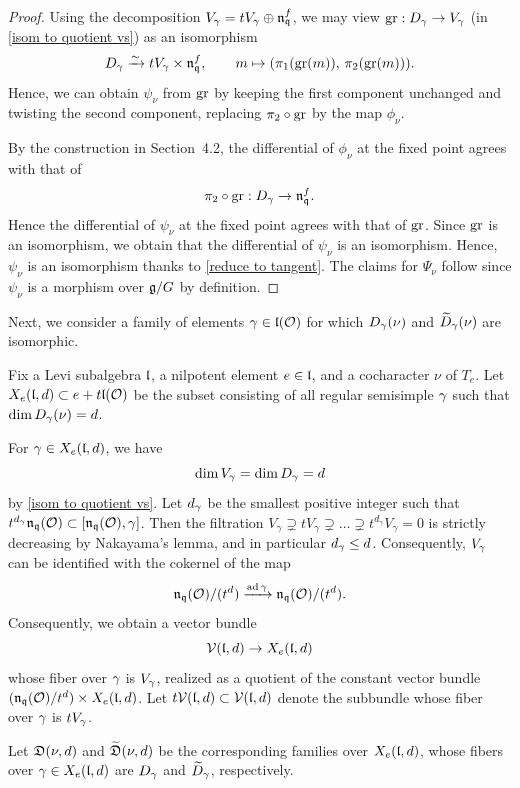 \documentclass[11pt]{article}
\numberwithin{equation}{section}
\begin{document}
\begin{proof}
Using the decomposition $V_\gamma = tV_\gamma \oplus \mathfrak{n}_{\mathfrak{q}}^f$, we may view $\operatorname{gr}: D_\gamma\to V_\gamma$ (in \cref{isom to quotient vs}) as an isomorphism
\[
D_\gamma \xrightarrow{\sim} tV_\gamma \times \mathfrak{n}_{\mathfrak{q}}^f,
\qquad
m \mapsto (\pi_1(\operatorname{gr}(m)),\, \pi_2(\operatorname{gr}(m))).
\]
Hence, we can obtain $\psi_\nu$ from $\operatorname{gr}$ by keeping the first component unchanged
and twisting the second component, replacing $\pi_2\circ \operatorname{gr}$ by the map $\phi_\nu$.

By the construction in Section~4.2, the differential of $\phi_\nu$ at the fixed
point agrees with that of
\[
\pi_2\circ \operatorname{gr} : D_\gamma \to \mathfrak{n}_{\mathfrak{q}}^f.
\]
Hence the differential of $\psi_\nu$ at the fixed point agrees with that of $\operatorname{gr}$.
Since $\operatorname{gr}$ is an isomorphism, we obtain that the differential of $\psi_\nu$ is an isomorphism. Hence, $\psi_\nu$ is an isomorphism thanks to \cref{reduce to tangent}. The claims for $\Psi_\nu$ follow since $\psi_\nu$ is a morphism over $\mathfrak{g}/G$ by definition.
\end{proof}
Next, we consider a family of elements $\gamma\in \mathfrak{l}(\mathcal{O})$ for which
$D_\gamma(\nu)$ and $\widetilde D_\gamma(\nu)$ are isomorphic.

\begin{defin}
Fix a Levi subalgebra $\mathfrak{l}$, a nilpotent element $e\in \mathfrak{l}$, and a cocharacter $\nu$ of $T_e$.
Let $X_e(\mathfrak{l},d)\subset e+t\mathfrak{l}(\mathcal{O})$ be the subset consisting of all regular semisimple
$\gamma$ such that $\dim D_\gamma(\nu) = d$.
\end{defin}

For $\gamma\in X_e(\mathfrak{l},d)$, we have
\[
\dim V_\gamma = \dim D_\gamma = d
\]
by \cref{isom to quotient vs}.
Let $d_\gamma$ be the smallest positive integer such that
$t^{d_\gamma}\mathfrak{n}_{\mathfrak{q}}(\mathcal{O})\subset [\mathfrak{n}_{\mathfrak{q}}(\mathcal{O}),\gamma]$.
Then the filtration $V_\gamma\supsetneq tV_\gamma\supsetneq\dots\supsetneq t^{d_\gamma}V_\gamma=0$ is strictly decreasing by Nakayama's lemma, and in particular $d_\gamma \le d$. Consequently, $V_\gamma$ can be identified with the cokernel of the map
\[
\mathfrak{n}_{\mathfrak{q}}(\mathcal{O})/(t^d)\xrightarrow{\operatorname{ad} \gamma} \mathfrak{n}_{\mathfrak{q}}(\mathcal{O})/(t^d).
\]
Consequently, we obtain a vector bundle
\[
\mathcal{V}(\mathfrak{l},d)\to X_e(\mathfrak{l},d)
\]
whose fiber over $\gamma$ is $V_\gamma$, realized as a quotient of the constant vector bundle $(\mathfrak{n}_{\mathfrak{q}}(\mathcal{O})/t^d)\times X_e(\mathfrak{l},d)$. Let $t\mathcal{V}(\mathfrak{l},d)\subset \mathcal{V}(\mathfrak{l},d)$ denote the subbundle whose
fiber over $\gamma$ is $tV_\gamma$.

Let $\mathfrak{D}(\nu,d)$ and $\widetilde{\mathfrak{D}}(\nu,d)$ be the corresponding
families over $X_e(\mathfrak{l},d)$, whose fibers over $\gamma\in X_e(\mathfrak{l},d)$ are
$D_\gamma$ and $\widetilde D_\gamma$, respectively.
\end{document}
